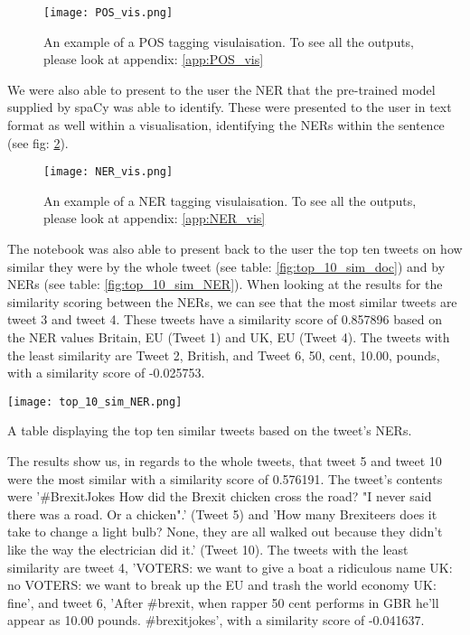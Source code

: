 	\begin{figure}[h]
		\centering
		\texttt{[image: POS\_vis.png]}
		\caption{An example of a POS tagging visulaisation. To see all the outputs, please look at appendix: \ref{app:POS_vis}}
		\label{fig:POS_example}
		
	\end{figure}

	We were also able to present to the user the NER that the pre-trained model supplied by spaCy was able to identify. These were presented to the user in text format as well within a visualisation, identifying the NERs within the sentence (see fig: \ref{fig:NER_example}).
	
	\begin{figure}[h]
		\centering
		\texttt{[image: NER\_vis.png]}
		\caption{An example of a NER tagging visulaisation. To see all the outputs, please look at appendix: \ref{app:NER_vis}}
		\label{fig:NER_example}
		
	\end{figure}

	The notebook was also able to present back to the user the top ten tweets on how similar they were by the whole tweet (see table: \ref{fig:top_10_sim_doc}) and by NERs (see table: \ref{fig:top_10_sim_NER}). When looking at the results for the similarity scoring between the NERs, we can see that the most similar tweets are tweet 3 and tweet 4. These tweets have a similarity score of 0.857896 based on the NER values Britain, EU (Tweet 1) and UK, EU (Tweet 4). The tweets with the least similarity are Tweet 2, British, and Tweet 6, 50, cent, 10.00, pounds, with a similarity score of -0.025753.
	 
	
	\begin{table}[h]
		\centering
		\texttt{[image: top\_10\_sim\_NER.png]}
		\caption{A table displaying the top ten similar tweets based on the tweet's NERs.}
		\label{fig:top_10_sim_NER}
		
	\end{table}

	The results show us, in regards to the whole tweets, that tweet 5 and tweet 10 were the most similar with a similarity score of 0.576191. The tweet's contents were '\#BrexitJokes How did the Brexit chicken cross the road? "I never said there was a road. Or a chicken".' (Tweet 5) and 'How many Brexiteers does it take to change a light bulb? None, they are all walked out because they didn't like the way the electrician did it.' (Tweet 10). The tweets with the least similarity are tweet 4, 'VOTERS: we want to give a boat a ridiculous name UK: no VOTERS: we want to break up the EU and trash the world economy UK: fine', and tweet 6, 'After \#brexit, when rapper 50 cent performs in GBR he'll appear as 10.00 pounds. \#brexitjokes', with a similarity score of -0.041637.

